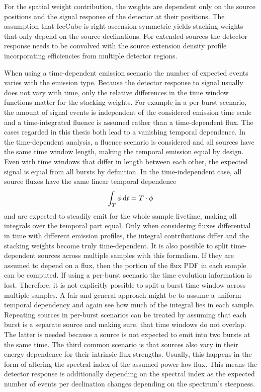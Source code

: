 For the spatial weight contribution, the weights are dependent only on the source positions and the signal response of the detector at their positions.
The assumption that IceCube is right ascension symmetric yields stacking weights that only depend on the source declinations.
For extended sources the detector response needs to be convolved with the source extension density profile incorporating efficiencies from multiple detector regions.

When using a time-dependent emission scenario the number of expected events varies with the emission type.
Because the detector response to signal usually does not vary with time, only the relative differences in the time window functions matter for the stacking weights.
For example in a per-burst scenario, the amount of signal events is independent of the considered emission time scale and a time-integrated fluence is assumed rather than a time-dependent flux.
The cases regarded in this thesis both lead to a vanishing temporal dependence.
In the time-dependent analysis, a fluence scenario is considered and all sources have the same time window length, making the temporal emission equal by design.
Even with time windows that differ in length between each other, the expected signal is equal from all bursts by definition.
In the time-independent case, all source fluxes have the same linear temporal dependence
\begin{equation}
  \int_T \phi \,\mathrm{d}t = T\cdot \phi
\end{equation}
and are expected to steadily emit for the whole sample livetime, making all integrals over the temporal part equal.
Only when considering fluxes differential in time with different emission profiles, the integral contributions differ and the stacking weights become truly time-dependent.
It is also possible to split time-dependent sources across multiple samples with this formalism.
If they are assumed to depend on a flux, then the portion of the flux PDF in each sample can be computed.
If using a per-burst scenario the time evolution information is lost.
Therefore, it is not explicitly possible to split a burst time window across multiple samples.
A fair and general approach might be to assume a uniform temporal dependency and again see how much of the integral lies in each sample.
Repeating sources in per-burst scenarios can be treated by assuming that each burst is a separate source and making sure, that time windows do not overlap.
The latter is needed because a source is not expected to emit into two bursts at the same time.
The third common scenario is that sources also vary in their energy dependence for their intrinsic flux strengths.
Usually, this happens in the form of altering the spectral index of the assumed power-law flux.
This means the detector response is additionally depending on the spectral index as the expected number of events per declination changes depending on the spectrum's steepness.


